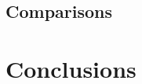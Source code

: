 \documentclass{article}
\begin{document}
  \subsection{Comparisons}

\section{Conclusions}
  




\end{document}
